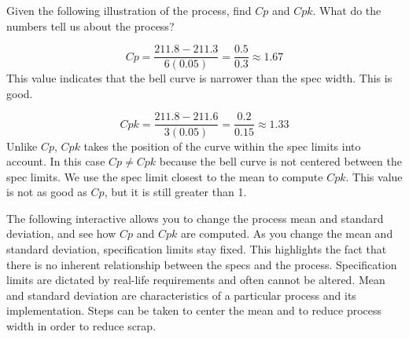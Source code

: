 \documentclass{ximera}
\begin{document}
\begin{example}
    Given the following illustration of the process, find $Cp$ and $Cpk$.  What do the numbers tell us about the process?
    \begin{center}
\end{center}

\begin{explanation}
    $$Cp=\frac{211.8-211.3}{6(0.05)}=\frac{0.5}{0.3}\approx 1.67$$
This value indicates that the bell curve is narrower than the spec width.  This is good.

$$Cpk=\frac{211.8-211.6}{3(0.05)}=\frac{0.2}{0.15}\approx 1.33$$
Unlike $Cp$, $Cpk$ takes the position of the curve within the spec limits into account.  In this case $Cp\neq Cpk$ because the bell curve is not centered between the spec limits.  We use the spec limit closest to the mean to compute $Cpk$.  This value is not as good as $Cp$, but it is still greater than 1.  
\end{explanation}
\end{example}

The following interactive allows you to change the process mean and standard deviation, and see how $Cp$ and $Cpk$ are computed.
As you change the mean and standard deviation, specification limits stay fixed. This highlights the fact that there is no inherent relationship between the specs and the process.  Specification limits are dictated by real-life requirements and often cannot be altered.  Mean and standard deviation are characteristics of a particular process and its implementation.  Steps can be taken to center the mean and to reduce process width in order to reduce scrap.
\end{document}
